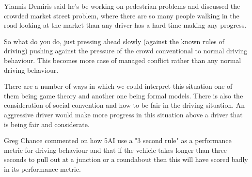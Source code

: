 \documentclass[sigconf]{acmart}
\begin{document}
Yiannis Demiris said he's be working on pedestrian problems and discussed the crowded market street problem, where there are so many people walking in the road looking at the market than any driver has a hard time making any progress.

So what do you do, just pressing ahead slowly (against the known rules of driving) pushing against the pressure of the crowd conventional to normal driving behaviour. This becomes more case of managed conflict rather than any normal driving behaviour. 

There are a number of ways in which we could interpret this situation one of them being game theory and another one being formal models. There is also the consideration of social convention and how to be fair in the driving situation. An aggressive driver would make more progress in this situation above a driver that is being fair and considerate.

Greg Chance commented on how 5AI use a "3 second rule" as a performance metric for driving behaviour and that if the vehicle takes longer than three seconds to pull out at a junction or a roundabout then this will have scored badly in its performance metric.

\end{document}

